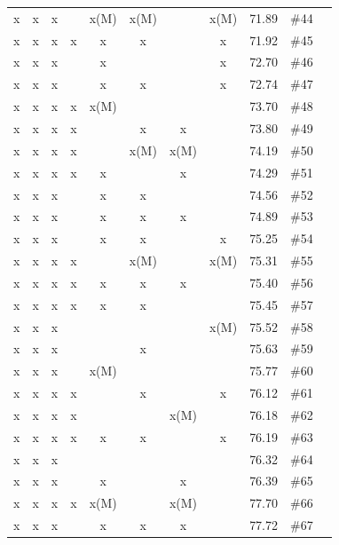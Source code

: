 \begin{table}[H]
{\begin{tabular}{c c c c c c c c c c c}
 x    & x    & x    &      & x(M) & x(M) &      & x(M) & 71.89 & \#44 \\
 x    & x    & x    & x    & x    & x    &      & x    & 71.92 & \#45 \\
 x    & x    & x    &      & x    &      &      & x    & 72.70 & \#46 \\
 x    & x    & x    &      & x    & x    &      & x    & 72.74 & \#47 \\
 x    & x    & x    & x    & x(M) &      &      &      & 73.70 & \#48 \\
 x    & x    & x    & x    &      & x    & x    &      & 73.80 & \#49 \\
 x    & x    & x    & x    &      & x(M) & x(M) &      & 74.19 & \#50 \\
 x    & x    & x    & x    & x    &      & x    &      & 74.29 & \#51 \\
 x    & x    & x    &      & x    & x    &      &      & 74.56 & \#52 \\
 x    & x    & x    &      & x    & x    & x    &      & 74.89 & \#53 \\
 x    & x    & x    &      & x    & x    &      & x    & 75.25 & \#54 \\
 x    & x    & x    & x    &      & x(M) &      & x(M) & 75.31 & \#55 \\
 x    & x    & x    & x    & x    & x    & x    &      & 75.40 & \#56 \\
 x    & x    & x    & x    & x    & x    &      &      & 75.45 & \#57 \\
 x    & x    & x    &      &      &      &      & x(M) & 75.52 & \#58 \\
 x    & x    & x    &      &      & x    &      &      & 75.63 & \#59 \\
 x    & x    & x    &      & x(M) &      &      &      & 75.77 & \#60 \\
 x    & x    & x    & x    &      & x    &      & x    & 76.12 & \#61 \\
 x    & x    & x    & x    &      &      & x(M) &      & 76.18 & \#62 \\
 x    & x    & x    & x    & x    & x    &      & x    & 76.19 & \#63 \\
 x    & x    & x    &      &      &      &      &      & 76.32 & \#64 \\
 x    & x    & x    &      & x    &      & x    &      & 76.39 & \#65 \\
 x    & x    & x    & x    & x(M) &      & x(M) &      & 77.70 & \#66 \\
 x    & x    & x    &      & x    & x    & x    &      & 77.72 & \#67 \\

\end{tabular}}
\end{table}
